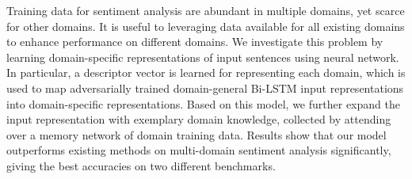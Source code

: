 Training data for sentiment analysis are abundant in multiple domains, yet scarce for other domains. It is useful to leveraging data available for all existing domains to enhance performance on different domains. We investigate this problem by learning domain-specific representations of input sentences using neural network. In particular, a descriptor vector is learned for representing each domain, which is used to map adversarially trained domain-general Bi-LSTM input representations into domain-specific representations. Based on this model, we further expand the input representation with exemplary domain knowledge, collected by attending over a memory network of domain training data. Results show that our model outperforms existing methods on multi-domain sentiment analysis significantly, giving the best accuracies on two different benchmarks.
